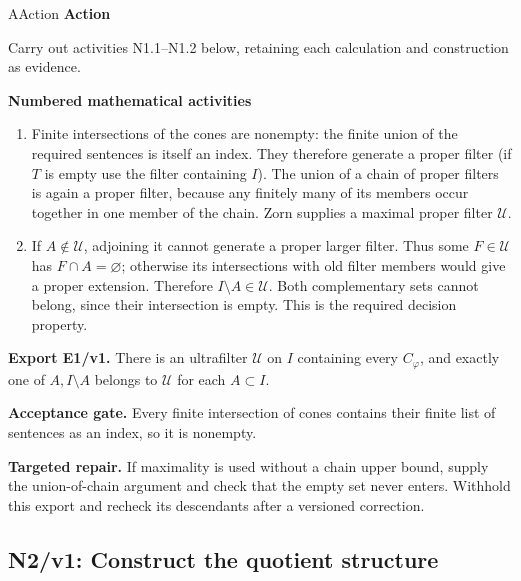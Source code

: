 \documentclass[preprint,12pt,aps,pra,showkeys,amsmath,amssymb,superscriptaddress,floatfix]{revtex4-2}
\theoremstyle{definition}
\theoremstyle{remark}
\newcommand{\mmfaculty}[3]{%
 \begin{mmfacultybox}{#1}{#2}
 {\sffamily\bfseries\color{MMBlue}#2}\par\smallskip #3
 \end{mmfacultybox}}
\newcommand{\field}[2]{\par\smallskip\noindent\textbf{#1.} #2\par}
\begin{document}
\mmfaculty{A}{Action}{Carry out activities N1.1--N1.2 below, retaining each calculation and
construction as evidence.}

\smallskip\noindent\textbf{Numbered mathematical activities}

\begin{enumerate}[label=N1.\arabic*,leftmargin=3.4em]

\item Finite intersections of the cones are nonempty: the finite union of the
required sentences is itself an index. They therefore generate a proper
filter (if \(T\) is empty use the filter containing \(I\)). The union of
a chain of proper filters is again a proper filter, because any finitely
many of its members occur together in one member of the chain. Zorn
supplies a maximal proper filter \(\mathcal U\).

\item If \(A\notin\mathcal U\), adjoining it cannot generate a proper larger
filter. Thus some \(F\in\mathcal U\) has \(F\cap A=\varnothing\);
otherwise its intersections with old filter members would give a proper
extension. Therefore \(I\setminus A\in\mathcal U\). Both complementary
sets cannot belong, since their intersection is empty. This is the
required decision property.

\end{enumerate}

\field{Export E1/v1}{There is an ultrafilter \(\mathcal U\) on \(I\) containing every
\(C_\varphi\), and exactly one of \(A,I\setminus A\) belongs to
\(\mathcal U\) for each \(A\subset I\).}

\field{Acceptance gate}{Every finite intersection of cones contains their finite list of
sentences as an index, so it is nonempty.}

\field{Targeted repair}{If maximality is used without a chain upper bound, supply the
union-of-chain argument and check that the empty set never enters.
Withhold this export and recheck its descendants after a versioned
correction.}

\endgroup

\clearpage

\begingroup\footnotesize\linespread{1.05}\selectfont\let\small\footnotesize

\subsection{N2/v1: Construct the quotient structure}
\end{document}
